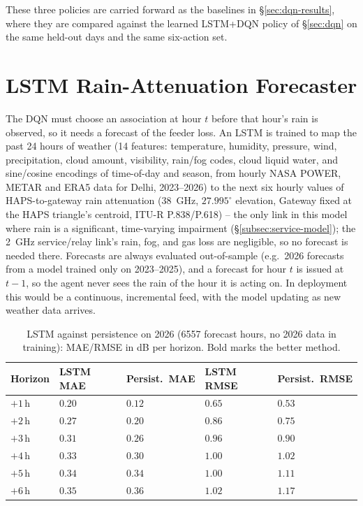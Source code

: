 \documentclass[]{ieeeaccess}
\begin{document}
These three policies are carried forward as the baselines in \S\ref{sec:dqn-results}, where they are compared against the learned LSTM+DQN policy of \S\ref{sec:dqn} on the same held-out days and the same six-action set.

\section{LSTM Rain-Attenuation Forecaster}
\label{sec:lstm}

The DQN must choose an association at hour $t$ before that hour's rain is observed, so it needs a forecast of the feeder loss. An LSTM is trained to map the past 24 hours of weather (14 features: temperature, humidity, pressure, wind, precipitation, cloud amount, visibility, rain/fog codes, cloud liquid water, and sine/cosine encodings of time-of-day and season, from hourly NASA POWER, METAR and ERA5 data for Delhi, 2023--2026) to the next six hourly values of HAPS-to-gateway rain attenuation (38~GHz, $27.995^\circ$ elevation, Gateway fixed at the HAPS triangle's centroid, ITU-R P.838/P.618) -- the only link in this model where rain is a significant, time-varying impairment (\S\ref{subsec:service-model}); the 2~GHz service/relay link's rain, fog, and gas loss are negligible, so no forecast is needed there. Forecasts are always evaluated out-of-sample (e.g.\ 2026 forecasts from a model trained only on 2023--2025), and a forecast for hour $t$ is issued at $t-1$, so the agent never sees the rain of the hour it is acting on. In deployment this would be a continuous, incremental feed, with the model updating as new weather data arrives.

\begin{table}[t]
\centering
\caption{LSTM against persistence on 2026 (6557 forecast hours, no 2026 data in training): MAE/RMSE in dB per horizon. Bold marks the better method.}
\label{tab:lstm-2026}
{\scriptsize\setlength{\tabcolsep}{3pt}
\begin{tabularx}{\columnwidth}{|>{\centering\arraybackslash}X|>{\centering\arraybackslash}X|>{\centering\arraybackslash}X|>{\centering\arraybackslash}X|>{\centering\arraybackslash}X|}
\hline
\textbf{Horizon} & \textbf{LSTM MAE} & \textbf{Persist.\ MAE} & \textbf{LSTM RMSE} & \textbf{Persist.\ RMSE} \\
\hline
$+1$\,h & $0.20$ & $\mathbf{0.12}$ & $0.65$ & $\mathbf{0.53}$ \\
\hline
$+2$\,h & $0.27$ & $\mathbf{0.20}$ & $0.86$ & $\mathbf{0.75}$ \\
\hline
$+3$\,h & $0.31$ & $\mathbf{0.26}$ & $0.96$ & $\mathbf{0.90}$ \\
\hline
$+4$\,h & $0.33$ & $\mathbf{0.30}$ & $\mathbf{1.00}$ & $1.02$ \\
\hline
$+5$\,h & $0.34$ & $0.34$ & $\mathbf{1.00}$ & $1.11$ \\
\hline
$+6$\,h & $\mathbf{0.35}$ & $0.36$ & $\mathbf{1.02}$ & $1.17$ \\
\hline
\end{tabularx}}
\end{table}
\end{document}
